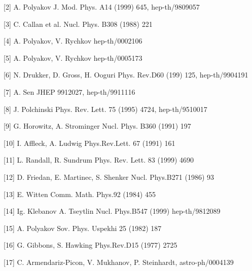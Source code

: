 \documentclass[a4paper,12pt]{article}
\begin{document}
[2]  A. Polyakov J. Mod. Phys. A14 (1999) 645, hep-th/9809057

[3]  C. Callan et al. Nucl. Phys. B308 (1988) 221

[4]  A. Polyakov, V. Rychkov hep-th/0002106

[5] A. Polyakov, V. Rychkov hep-th/0005173

[6] N. Drukker, D. Gross, H. Ooguri Phys. Rev.D60 (199) 125, hep-th/9904191

[7] A. Sen JHEP 9912027, hep-th/9911116

[8] J. Polchinski Phys. Rev. Lett. 75 (1995) 4724, hep-th/9510017

[9] G. Horowitz, A. Strominger Nucl. Phys. B360 (1991) 197

[10] I. Affleck, A. Ludwig Phys.Rev.Lett. 67 (1991) 161

[11] L. Randall, R. Sundrum Phys. Rev. Lett. 83 (1999) 4690

[12] D. Friedan, E. Martinec, S. Shenker Nucl. Phys.B271 (1986) 93

[13] E. Witten Comm. Math. Phys.92 (1984) 455

[14] Ig. Klebanov A. Tseytlin Nucl. Phys.B547 (1999) hep-th/9812089

[15] A. Polyakov Sov. Phys. Uspekhi 25 (1982) 187

[16] G. Gibbons, S. Hawking Phys.Rev.D15 (1977) 2725

[17] C. Armendariz-Picon, V. Mukhanov, P. Steinhardt, astro-ph/0004139
\end{document}
